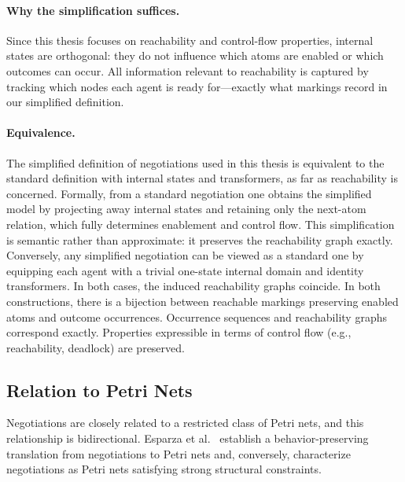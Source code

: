 \paragraph{Why the simplification suffices.} Since this thesis focuses on reachability and control-flow properties, internal states are orthogonal: they do not influence which atoms are enabled or which outcomes can occur. All information relevant to reachability is captured by tracking which nodes each agent is ready for—exactly what markings record in our simplified definition.

\paragraph{Equivalence.}
The simplified definition of negotiations used in this thesis is equivalent to the standard definition with internal states and transformers, as far as reachability is concerned. Formally, from a standard negotiation one obtains the simplified model by projecting away internal states and retaining only the next-atom relation, which fully determines enablement and control flow. This simplification is semantic rather than approximate: it preserves the reachability graph exactly. Conversely, any simplified negotiation can be viewed as a standard one by equipping each agent with a trivial one-state internal domain and identity transformers. In both cases, the induced reachability graphs coincide. In both constructions, there is a bijection between reachable markings preserving enabled atoms and outcome occurrences. Occurrence sequences and reachability graphs correspond exactly. Properties expressible in terms of control flow (e.g., reachability, deadlock) are preserved.


\subsection{Relation to Petri Nets}
\label{sec:neg-pn}

Negotiations are closely related to a restricted class of Petri nets, and this
relationship is bidirectional. Esparza et al.~\cite{esparza-neg-pn,esparza-neg-ceur}
establish a behavior-preserving translation from negotiations to Petri nets and,
conversely, characterize negotiations as Petri nets satisfying strong structural
constraints.

